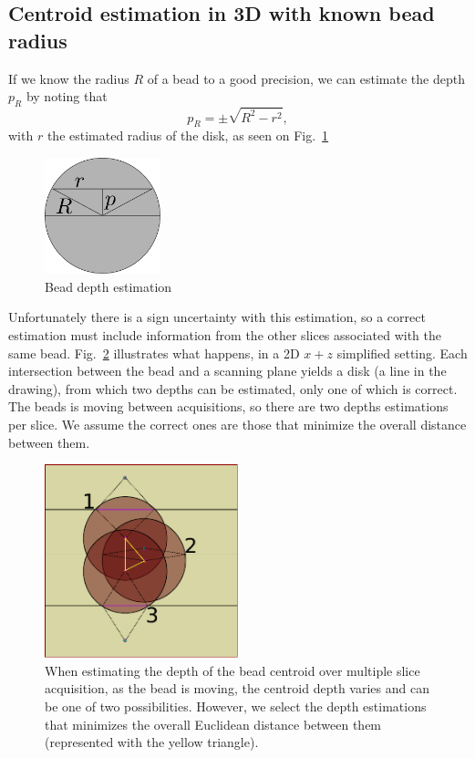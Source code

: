 \documentclass{llncs}
\begin{document}
\subsection{Centroid estimation in 3D with known bead radius}
If we know the radius $R$ of a bead to a good precision, we can estimate the depth $p_R$ by noting that
\begin{equation}
p_R = \pm\sqrt{R^2-r^2},\label{eq:depth}
\end{equation}
with $r$ the estimated radius of the disk, as seen on Fig.~\ref{fig:depth}

\begin{figure}
\centering
\includegraphics[width=0.3\textwidth]{images/depth.pdf}
\caption{Bead depth estimation}
\label{fig:depth}
\end{figure}
Unfortunately there is a sign uncertainty with this estimation, so a correct estimation must include information from the other slices associated with the same bead. Fig.~\ref{fig:multidepth} illustrates what happens, in a 2D $x+z$ simplified setting. Each intersection between the bead and a scanning plane yields a disk (a line in the drawing), from which two depths can be estimated,  only one of which is correct. The beads is moving between acquisitions, so there are two depths estimations per slice. We assume the correct ones are those that minimize the overall distance between them.

\begin{figure}
\centering
\includegraphics[width=0.5\textwidth]{images/multidepth.pdf}
\caption{When estimating the depth of the bead centroid over multiple slice acquisition, as the bead is moving, the centroid depth varies and can be one of two possibilities. However, we select the depth estimations that minimizes the overall Euclidean distance between them (represented with the yellow triangle).}
\label{fig:multidepth}
\end{figure}
\end{document}
